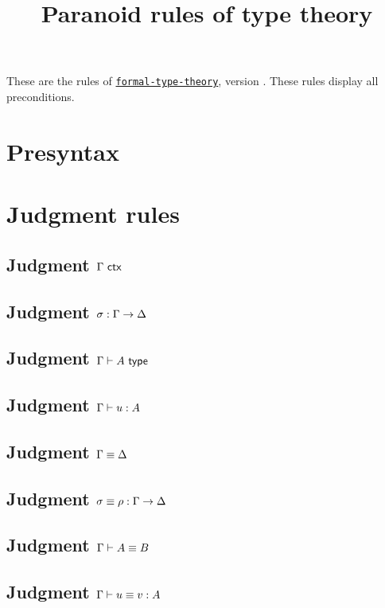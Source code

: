 \documentclass{article}
\begin{document}
\title{Paranoid rules of type theory}
\author{}
\maketitle

These are the rules of
\href{https://github.com/TheoWinterhalter/formal-type-theory}{\texttt{formal-type-theory}},
version \texttt{}. These rules display all preconditions.

\section{Presyntax}



\section{Judgment rules}

\subsection{Judgment $\Gamma\ \mathsf{ctx}$}

\isctxRulesParanoid

\subsection{Judgment $\sigma : \Gamma \to \Delta$}

\issubstRulesParanoid

\subsection{Judgment $\Gamma \vdash A \ \mathsf{type}$}

\istypeRulesParanoid

\subsection{Judgment $\Gamma \vdash u : A$}

\istermRulesParanoid

\subsection{Judgment $\Gamma \equiv \Delta$}

\eqctxRulesParanoid

\subsection{Judgment $\sigma \equiv \rho : \Gamma \to \Delta$}

\eqsubstRulesParanoid

\subsection{Judgment $\Gamma \vdash A \equiv B$}

\eqtypeRulesParanoid

\subsection{Judgment $\Gamma \vdash u \equiv v : A$}

\eqtermRulesParanoid
\end{document}
